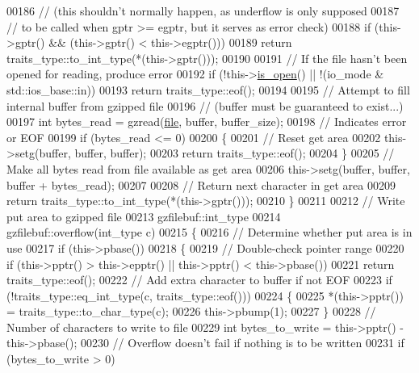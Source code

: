 \begin{DoxyCode}
{00186   \textcolor{comment}{// (this shouldn't normally happen, as underflow is only supposed}
00187   \textcolor{comment}{// to be called when gptr >= egptr, but it serves as error check)}
00188   \textcolor{keywordflow}{if} (this->gptr() && (this->gptr() < this->egptr()))
00189     \textcolor{keywordflow}{return} traits\_type::to\_int\_type(*(this->gptr()));
00190 
00191   \textcolor{comment}{// If the file hasn't been opened for reading, produce error}
00192   \textcolor{keywordflow}{if} (!this->\hyperlink{classgzofstream_acb1c9c6dccaf41bc5e44c2263ea48de3}{is\_open}() || !(io\_mode & std::ios\_base::in))
00193     \textcolor{keywordflow}{return} traits\_type::eof();
00194 
00195   \textcolor{comment}{// Attempt to fill internal buffer from gzipped file}
00196   \textcolor{comment}{// (buffer must be guaranteed to exist...)}
00197   \textcolor{keywordtype}{int} bytes\_read = gzread(\hyperlink{structfile}{file}, buffer, buffer\_size);
00198   \textcolor{comment}{// Indicates error or EOF}
00199   \textcolor{keywordflow}{if} (bytes\_read <= 0)
00200   \{
00201     \textcolor{comment}{// Reset get area}
00202     this->setg(buffer, buffer, buffer);
00203     \textcolor{keywordflow}{return} traits\_type::eof();
00204   \}
00205   \textcolor{comment}{// Make all bytes read from file available as get area}
00206   this->setg(buffer, buffer, buffer + bytes\_read);
00207 
00208   \textcolor{comment}{// Return next character in get area}
00209   \textcolor{keywordflow}{return} traits\_type::to\_int\_type(*(this->gptr()));
00210 \}
00211 
00212 \textcolor{comment}{// Write put area to gzipped file}
00213 gzfilebuf::int\_type
00214 gzfilebuf::overflow(int\_type c)
00215 \{
00216   \textcolor{comment}{// Determine whether put area is in use}
00217   \textcolor{keywordflow}{if} (this->pbase())
00218   \{
00219     \textcolor{comment}{// Double-check pointer range}
00220     \textcolor{keywordflow}{if} (this->pptr() > this->epptr() || this->pptr() < this->pbase())
00221       \textcolor{keywordflow}{return} traits\_type::eof();
00222     \textcolor{comment}{// Add extra character to buffer if not EOF}
00223     \textcolor{keywordflow}{if} (!traits\_type::eq\_int\_type(c, traits\_type::eof()))
00224     \{
00225       *(this->pptr()) = traits\_type::to\_char\_type(c);
00226       this->pbump(1);
00227     \}
00228     \textcolor{comment}{// Number of characters to write to file}
00229     \textcolor{keywordtype}{int} bytes\_to\_write = this->pptr() - this->pbase();
00230     \textcolor{comment}{// Overflow doesn't fail if nothing is to be written}
00231     \textcolor{keywordflow}{if} (bytes\_to\_write > 0)
}
\end{DoxyCode}
